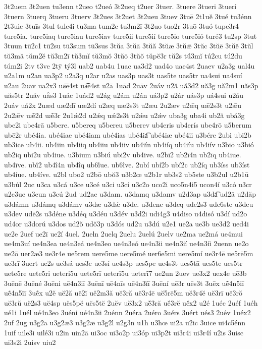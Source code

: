 {3t2uem
3t2uen
tu3enn
t2ueo
t2ueó
3t2ueq
t2uer
3tuer.
3tuere
3tueri
3tuerí
3tuern
3tuerq
3tueru
3tuerv
3t2ues
3t2uet
3t2ueu
3tuev
3tuē
2t1uĕ
3tué
tu3énn
2t3uic
3tuīs
3tul
tule4i
tu3ma
tum2e
tu3m2ī
3t2uo
tuo2r
3tuō
3tuó
tupe3r4
ture5ia.
ture5iaq
ture5iau
ture5iav
ture5ii
ture5ií
ture5io
ture5ió
turé3
tu2sp
3tut
3tuun
tū2c1
tū2su
tū3sum
tū3sus
3tŭa
3tŭā
3tŭă
3tŭæ
3tŭǣ
3tŭc
3tŭē
3tŭĕ
3tŭl
tŭ3mă
tŭm2ĕ
tŭ3m2ī
tŭ3mĭ
tŭ3mŏ
3tŭō
3tŭŏ
tŭpĕ3r
tŭ2s
tŭ́3mĭ
tú2cu
tú2du
túm2i
2tv
t3ve
2tȳ
tý3l
uab2
uab4u
1uac
ua3d2
uad4o
uae4st
2uaev
u2a3g
ual4u
u2a1m
u2an
ua3p2
u2a3q
u2ar
u2as
uas3p
uas3t
uas5te
uas5tr
ua4sui
ua4suí
u2au
2uav
ua2x3
ua͞e4st
ua͡e4st
u2ā
1uād
2uāv
2uā́v
u2ă
uă3d2
uă3g
uă2m1
uăs3p
uăs5tr
2uăv
uắs3
1uác
1uád2
u2ág
u2ám
u2án
uá3p2
u2ár
uás3p
uá4sui
u2áu
2uáv
uá2x
2uæd
uæ2dī
uæ2dí
u2æq
uæ2s3t
u2æu
2u2æv
u2ǣq
uǣ2s3t
u2ǣu
2u2ǣv
uǣ́2d
uǣ́3r
2u1ǽ2d
u2ǽq
uǽ2s3t
u2ǽu
u2ǽv
uba3g
uba4i
ub2ă
ubá3g
ube2i
ube4rā
u5bere.
u5bereq
u5bereu
u5berev
ub4eris
ub4erís
ube4rō
u5berum
ubē2r
ubé4ia.
ubé4iae
ubé4iam
ubé4ias
ubé4ia͡
ubé4iæ
ubé4ii
u3bére
2ubi
ubi2b
ub3ice
ub4ii.
ub4iin
ub4iiq
ub4iiu
ub4iiv
ub4iín
ub4iíq
ub4iíu
ub4iív
u3biō
u3bió
ub2iq
ubi2u
ub4iue.
u3bium
u3biú
ubi2v
ub4ive.
u2bī2
ub2ī4n
ub2īq
ub4īue.
ub4īve.
ubī́2
ub4ī́4n
ub4ī́q
ub6ī́ue.
ub6ī́ve.
2ubí
ubí2b
ubí2c
ub2íq
ub3íss
ub3íst
ub4íue.
ub4íve.
u2bl
ubo2
u2bō
ubŏ3
u3b2œ
u2b1r
ub3s2
ub5ste
u3b2ul
u2b1ū
u3búl
2uc
u3ca
u3cá
u3ce
u3cé
u3ci
u3cí
u3c2o
uco2i
uco5n4i5
ucon4í
u3có
u3cr
u2c3ue
u3cun
u3cú
2ud
ud2ac
u3dam.
u3damq
u3damv
u2d3ap
u3da͡
ud2ā
u2dăp
u3dámn
u3dámq
u3dámv
u3dæ
u3dǽ
u3de.
u3dene
u3deq
ude2s3
ude6ste
u3deu
u3dev
udē2s
u3déne
u3déq
u3déu
u3dév
u3d2i
udi4g3
u4diso
u4disó
u3dí
ud2o
ud4or
u3dorú
u3dos
ud2ŏ
udŏ3p
u3dós
ud2u
u3dú
u2e1
ue2a
ue3b
ue3d2
ued4i
ue2e
2uef
ue2ī
ue2í
4uel.
2ueln
2uelq
2uelu
2uelú
2uelv
ue2ma
ue2má
ue4mui
ue4m3uí
ue4n3ea
ue4n3eá
ue4n3eo
ue4n3eó
ue4n3ii
ue4n3ií
ue4n3íi
2uenn
ue2o
ue2ō
uer2æ3
ue3r4e
ue5rem
uere5me
uere5mé
uer6e5mi
uere5mí
ue3r4ē
ue5rē5m
ue3rī
3uert
ue2s
ue3sá
ues3c
ue3sí
ue4s3p
ues5pe
ue4s3t
ues5tā
ues5te
ues5tr
uete5re
uete5ri
ueteri5u
uete5rī
ueterī5u
ueterī́7
ue2un
2uev
ue3x2
uex4e
uē3b
3uēnē
3uēné
3uēni
uē4n3iī
3uēnī
uē4nīs
uē4n3ĭī
3uēní
uē3r
uēs3t
3uēx
uḗ4n5iī
uḗ4n5ĭī
3uḗx
u2ĕ
uĕ2ă
uĕ2ĭ
uĕ2m3ă
uĕ3ră
uĕ3r4ē
uĕ5rē5m
uĕ3r4ĕ
uĕ3rī
uĕ3rŏ
uĕ3rŭ
uĕ2s3
uĕ4sp
uĕs5pĕ
uĕs5tĕ
2uĕv
uĕ3x2
uĕ́3ră
uĕ́3rĕ
uĕ́x2
u2é
1uéc
2uéf
1uéh
ué1i
1uél
ué4n3eo
3uéni
ué4n3ii
2uénn
2uéra
2uéro
3uérs
3uért
ués3
2uév
1uéx2
2uf
2ug
u3g2a
u3g2æ3
u3g2ǣ
u3g2l
u2g3n
u1h
u3hœ
ui2a
u2ic
3uice
ui4c5énn
1uif
uile3i
uilé3i
u2in
uin2ā
ui3oc
ui3o2p
ui3óp
ui3p2t
ui3r4i
ui3r4í
u2is
3uisc
ui3s2i
2uisv
uiu2
}
